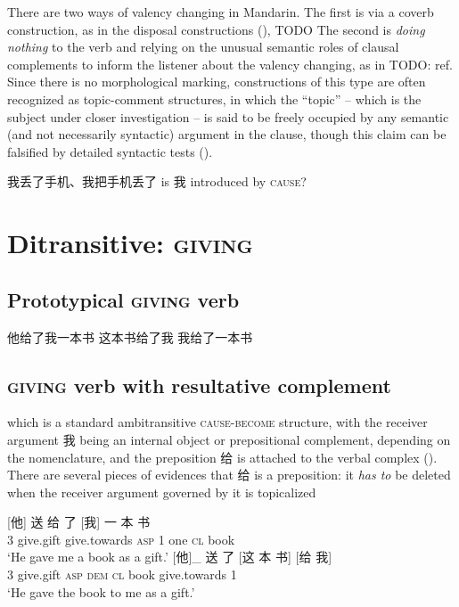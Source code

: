 \documentclass[UTF8, a4paper, oneside, scheme=plain, 12pt]{ctexrep}
\newcommand{\translate}[1]{`#1'}
\newcommand*{\category}[1]{\textsc{#1}}
\begin{document}
There are two ways of valency changing in Mandarin.
The first is via a coverb construction, 
as in the disposal constructions (),
TODO 
The second is \emph{doing nothing} to the verb 
and relying on the unusual semantic roles of clausal complements 
to inform the listener about the valency changing,
as in TODO: ref.
Since there is no morphological marking,
constructions of this type are often recognized as topic-comment structures,
in which the ``topic'' -- which is the subject under closer investigation -- 
is said to be freely occupied by any semantic (and not necessarily syntactic) argument in the clause,
though this claim can be falsified by detailed syntactic tests ().


我丢了手机、我把手机丢了 is 我 introduced by \category{cause}?

\section{Ditransitive: \category{giving}}\label{sec:verb-valency.giving}

\subsection{Prototypical \category{giving} verb}\label{sec:verb-valency.giving.prototypical}

\begin{exe}
    \ex 他给了我一本书
    \ex 这本书给了我
    \ex *我给了一本书
\end{exe}

\subsection{\category{giving} verb with resultative complement}\label{sec:verb-valency.giving.complement}

which is a standard ambitransitive \category{cause}-\category{become} structure,
with the receiver argument 我 being an internal object or prepositional complement,
depending on the nomenclature,
and the preposition 给 is attached to the verbal complex
().
There are several pieces of evidences 
that 给 is a preposition: 
it \emph{has to} be deleted when the receiver argument governed by it 
is topicalized 

\citep{paul2010applicative}

\begin{exe}
    \ex\label{ex:verb-phrase.cause.experience.1} 
    \gll {} [他] 送 给 了 [我] 一 本 书 \\
    {} 3 give.gift give.towards \category{asp} 1 one \category{cl} book \\
    \glt \translate{He gave me a book as a gift.}
    \ex\label{ex:verb-phrase.cause.experience.1-cause-become}
    \gll {} [他]_{\text{subject, \category{cause}}} 送 了 [这 本 书] [给 我] \\
    {} 3 give.gift \category{asp} \category{dem} \category{cl} book give.towards 1 \\
    \glt \translate{He gave the book to me as a gift.}
\end{exe}
\end{document}
